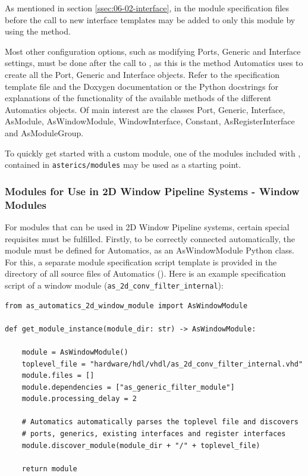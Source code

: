 As mentioned in section \ref{ssec:06-02-interface}, in the module specification files before the call to  new interface templates may be added to only this module by using the  method.

Most other configuration options, such as modifying Ports, Generic and Interface settings, must be done after the call to , as this is the method Automatics uses to create all the Port, Generic and Interface objects.
Refer to the specification template file and the Doxygen documentation or the Python docstrings for explanations of the functionality of the available methods of the different Automatics objects.
Of main interest are the classes Port, Generic, Interface, AsModule, AsWindowModule, WindowInterface, Constant, AsRegisterInterface and AsModuleGroup.

To quickly get started with a custom module, one of the modules included with \asterics, contained in \texttt{asterics/modules} may be used as a starting point.

\subsubsection{Modules for Use in 2D Window Pipeline Systems - Window Modules}
\label{sec:06-02-custom_window_modules}

For modules that can be used in 2D Window Pipeline systems, certain special requisites must be fulfilled.
Firstly, to be correctly connected automatically, the module must be defined for Automatics, as an AsWindowModule Python class.
For this, a separate module specification script template is provided in the directory of all source files of Automatics ().
Here is an example specification script of a window module (\texttt{as\_2d\_conv\_filter\_internal}):
\begin{lstlisting}[style=AutomaticsPython, label=lst:06-02_window_module_spec, caption=Specification script for a typical window module]
from as_automatics_2d_window_module import AsWindowModule

def get_module_instance(module_dir: str) -> AsWindowModule:

    module = AsWindowModule()
    toplevel_file = "hardware/hdl/vhdl/as_2d_conv_filter_internal.vhd"
    module.files = []
    module.dependencies = ["as_generic_filter_module"]
    module.processing_delay = 2

    # Automatics automatically parses the toplevel file and discovers
    # ports, generics, existing interfaces and register interfaces
    module.discover_module(module_dir + "/" + toplevel_file)

    return module
\end{lstlisting}

